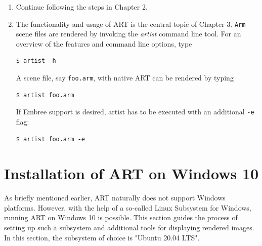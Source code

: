 \begin{enumerate}
	
	\item Continue following the steps in Chapter 2.
	
	\item The functionality and usage of ART is the central topic of Chapter 3.
	\texttt{Arm} scene files are rendered by invoking the \emph{artist} command line tool. For an overview of the features and command line options, type
\begin{Verbatim}
$ artist -h
\end{Verbatim}
	
	A scene file, say \texttt{foo.arm}, with native ART can be rendered by typing
\begin{Verbatim}
$ artist foo.arm
\end{Verbatim}
	If Embree support is desired, artist has to be executed with an additional \texttt{-e} flag:
\begin{Verbatim}
$ artist foo.arm -e
\end{Verbatim}
	
	
\end{enumerate} 



\section{Installation of ART on Windows 10}
As briefly mentioned earlier, ART naturally does not support Windows platforms. However, with the help of a so-called Linux Subsystem for Windows, running ART on Windows 10 is possible. This section guides the process of setting up such a subsystem and additional tools for displaying rendered images. In this section, the subsystem of choice is "Ubuntu 20.04 LTS".

